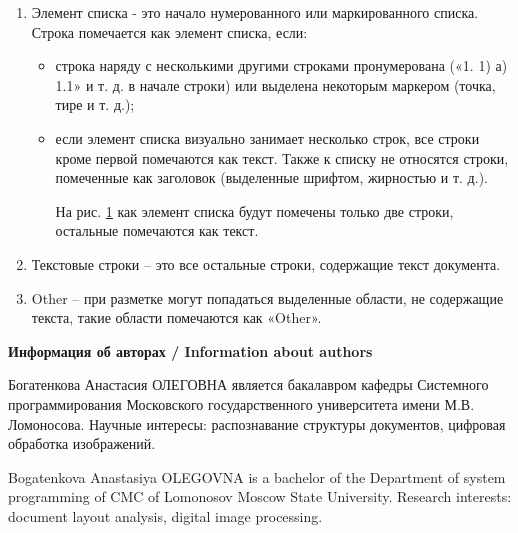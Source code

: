 \documentclass{ProcISPRAS}
\begin{document}
\begin{enumerate}
	\item Элемент списка - это начало нумерованного или маркированного списка. Строка помечается как элемент списка, если:
	\begin{itemize}
		\item строка наряду с несколькими другими строками пронумерована («1. 1) а) 1.1» и т. д. в начале строки) или выделена некоторым маркером (точка, тире и т. д.);
		
		\item если элемент списка визуально занимает несколько строк, все строки кроме первой помечаются как текст. Также к списку не относятся строки, помеченные как заголовок (выделенные шрифтом, жирностью и т. д.).
		
		На рис. \ref{fig:4} как элемент списка будут помечены только две строки, остальные помечаются как текст.
		
		\begin{figure}[ht]
		    \label{fig:4}
		\end{figure}
		
	\end{itemize}
	
	\item Текстовые строки -- это все остальные строки, содержащие текст документа.
	\item Other -- при разметке могут попадаться выделенные области, не содержащие текста, такие области помечаются как «Other».
	
\end{enumerate}



{\vskip 12pt\normalfont\sffamily\bfseries\large Информация об авторах / Information about authors}
\setlength{\parskip}{6pt}

Богатенкова Анастасия ОЛЕГОВНА является бакалавром кафедры Системного программирования Московского государственного университета имени М.В. Ломоносова. Научные интересы: распознавание структуры документов, цифровая обработка изображений.

Bogatenkova Anastasiya OLEGOVNA is a bachelor of the Department of system programming of CMC of Lomonosov Moscow State University. Research interests: document layout analysis, digital image processing.
\end{document}
